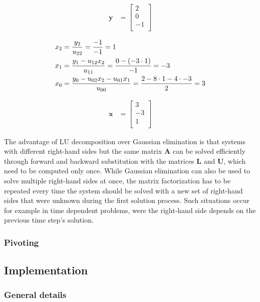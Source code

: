 \begin{align*}
\mathbf{y} 
& =
\begin{bmatrix}
2\\
0\\
-1\\
\end{bmatrix}
\end{align*}

\begin{align*}
x_2 &= \frac{y_2}{u_{22}} = \frac{-1}{-1}= 1\\
x_1 &= \frac{y_1 - u_{12}x_2}{u_{11}} = \frac{0 - \left(-3 \cdot 1\right)}{-1} = -3\\
x_0 &= \frac{y_0 - u_{02}x_2 - u_{01}x_1}{u_{00}} = \frac{2 - 8 \cdot 1 - 4 \cdot -3}{2} =  3
\end{align*}

\begin{align*}
\mathbf{x} 
& =
\begin{bmatrix}
3\\
-3\\
1\\
\end{bmatrix}
\end{align*}

The advantage of LU decomposition over Gaussian elimination is that systems with different right-hand sides but the same matrix $\mathbf{A}$ can be solved efficiently through forward and backward substitution with the matrices $\mathbf{L}$ and $\mathbf{U}$, which need to be computed only once. 
While Gaussian elimination can also be used to solve multiple right-hand sides at once, the matrix factorization has to be repeated every time the system should be solved with a new set of right-hand sides that were unknown during the first solution process.
Such situations occur for example in time dependent problems, were the right-hand side depends on the previous time step's solution.

\subsubsection{Pivoting}


\subsection{Implementation}

\subsubsection{General details}

